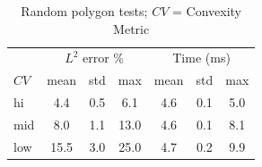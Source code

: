 \begin{table}[ht!]
\centering
\caption{Random polygon tests; $CV$ = Convexity Metric}
\label{table:ch2_random_tests}
\begin{tabular}{@{}lcccccc@{}}
\toprule
    &    \multicolumn{3}{c}{$L^2$ error \%} & \multicolumn{3}{c}{Time (ms)} \\
$CV$  &    mean & std &  max &      mean & std &  max \\
\midrule

hi    &     4.4 & 0.5 &  6.1 &       4.6 & 0.1 & 5.0 \\
mid   &     8.0 & 1.1 & 13.0 &       4.6 & 0.1 & 8.1 \\
low   &    15.5 & 3.0 & 25.0 &       4.7 & 0.2 & 9.9 \\
\bottomrule
\end{tabular}
\end{table}


